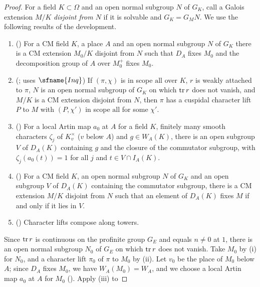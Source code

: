 \begin{proof}
For a field $K\subset\Omega$ and an open normal subgroup $N$ of $G_K$, call a Galois extension $M/K$ \emph{disjoint
from $N$} if it is solvable and $G_K=G_MN$. We use the following results of the development.
\begin{enumerate}[label=(\roman*),nosep]
\item () For a CM field $K$, a place $A$ and an open
  normal subgroup $N$ of $G_K$ there is a CM extension $M_0/K$ disjoint from $N$ such that $D_A$ fixes $M_0$ and the
  decomposition group of $A$ over $M_0^+$ fixes $M_0$.
\item (; uses $\sfname{Inq}$) If $(\pi,\chi)$
  is in scope $\mathrm{all}$ over $K$, $r$ is weakly attached to $\pi$, $N$ is an open normal subgroup of $G_K$ on which
  $\operatorname{tr} r$ does not vanish, and $M/K$ is a CM extension disjoint from $N$, then $\pi$ has a cuspidal character lift
  $P$ to $M$ with $(P,\chi')$ in scope $\mathrm{all}$ for some $\chi'$.
\item () For a local Artin map $a_0$ at $A$ for a
  field $K$, finitely many smooth characters $\zeta_j$ of $K_{v}^\times$ ($v$ below $A$) and $g\in W_A(K)$, there is an
  open subgroup $V$ of $D_A(K)$ containing $g$ and the closure of the commutator subgroup, with $\zeta_j(a_0(t))=1$ for
  all $j$ and $t\in V\cap I_A(K)$.
\item () For a CM field $K$, an open normal
  subgroup $N$ of $G_K$ and an open subgroup $V$ of $D_A(K)$ containing the commutator subgroup, there is a CM extension
  $M/K$ disjoint from $N$ such that an element of $D_A(K)$ fixes $M$ if and only if it lies in $V$.
\item () Character lifts compose along towers.
\end{enumerate}
Since $\operatorname{tr} r$ is continuous on the profinite group $G_E$ and equals $n\ne0$ at $1$, there is an open normal
subgroup $N_0$ of $G_E$ on which $\operatorname{tr} r$ does not vanish. Take $M_0$ by (i) for $N_0$, and a character lift $\pi_0$
of $\pi$ to $M_0$ by (ii). Let $v_0$ be the place of $M_0$ below $A$; since $D_A$ fixes $M_0$, we have $W_A(M_0)=W_A$, and
we choose a local Artin map $a_0$ at $A$ for $M_0$ (). Apply (iii) to

\end{proof}
